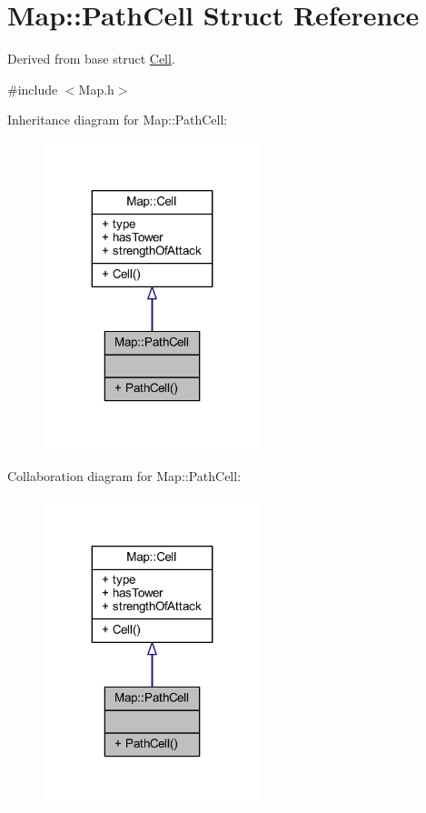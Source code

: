 \hypertarget{struct_map_1_1_path_cell}{\section{Map\+:\+:Path\+Cell Struct Reference}
\label{struct_map_1_1_path_cell}
}


Derived from base struct \hyperlink{struct_map_1_1_cell}{Cell}.  




{\ttfamily \#include $<$Map.\+h$>$}



Inheritance diagram for Map\+:\+:Path\+Cell\+:
\nopagebreak
\begin{figure}[H]
\begin{center}
\leavevmode
\includegraphics[width=179pt]{struct_map_1_1_path_cell__inherit__graph}
\end{center}
\end{figure}


Collaboration diagram for Map\+:\+:Path\+Cell\+:
\nopagebreak
\begin{figure}[H]
\begin{center}
\leavevmode
\includegraphics[width=179pt]{struct_map_1_1_path_cell__coll__graph}
\end{center}
\end{figure}
